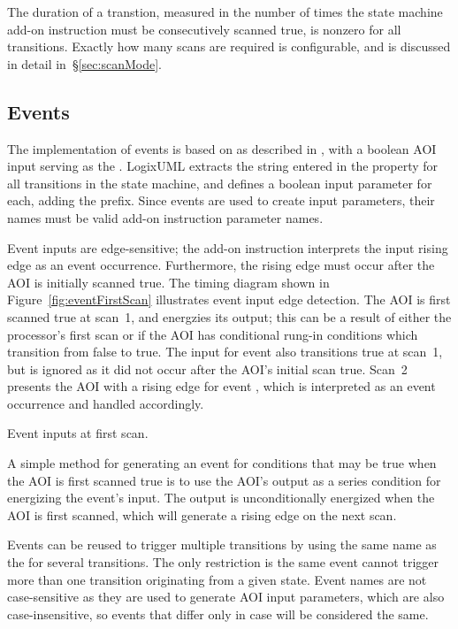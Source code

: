 The duration of a transtion, measured in the number of times the state machine
add-on instruction must be consecutively scanned true, is nonzero for all
transitions. Exactly how many scans are required is configurable,
and is discussed in detail in~\S\ref{sec:scanMode}.


\subsection{Events}

The implementation of events is based on 
as described in \textcite[\S13.3.3.3]{OMGUML}, with a boolean AOI input
serving as the . LogixUML extracts
the string entered in the  property for
all transitions
in the state machine, and defines a boolean input parameter for each,
adding the  prefix. Since events are used to create
input parameters, their names must be valid add-on instruction parameter
names.

Event inputs are edge-sensitive; the add-on instruction interprets the
input rising edge as an event occurrence. Furthermore,
the rising edge must occur after the AOI is initially scanned true.
The timing diagram shown in Figure~\ref{fig:eventFirstScan} illustrates
event input edge detection. The AOI is first scanned true at scan~1, and
energzies its  output; this can be a result of either
the processor's first scan or if the AOI has conditional rung-in
conditions which transition from false to true.
The input for event  also transitions true at scan~1, but
is ignored as it did not occur after the AOI's initial scan true.
Scan~2 presents the AOI with a rising edge for event ,
which is interpreted as an event occurrence and handled accordingly.

               {Event inputs at first scan.}

A simple method for generating an event for conditions that may be
true when the AOI is first scanned true is to use the AOI's
 output as a series condition for energizing the
event's input. The  output is unconditionally energized
when the AOI is first scanned, which will generate a rising edge on the
next scan.

Events can be reused to trigger multiple transitions by using the
same name as the  for several transitions.
The only restriction is the same event cannot trigger more than
one transition originating from a given state.
Event names are not case-sensitive as they are used to generate AOI input
parameters, which are also case-insensitive, so events that differ only in
case will be considered the same.

